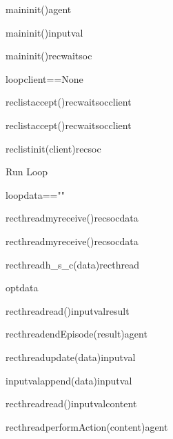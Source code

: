 \documentclass{article}
\begin{document}
\begin{figure}
\begin{sequencediagram}[.9]
		\begin{messcall}{main}{init()}{agent}{}		
		\end{messcall}		
		\begin{messcall}{main}{init()}{inputval}
		\end{messcall}
		\begin{messcall}{main}{init()}{recwaitsoc}{}		
		\end{messcall}		
		\begin{sdblock}{loop}{client==None}
			\begin{call}{reclist}{accept()}{recwaitsoc}{client}
			\end{call}
		\end{sdblock}
		\begin{call}{reclist}{accept()}{recwaitsoc}{client}
		\end{call}		
		\begin{messcall}{reclist}{init(client)}{recsoc}{}
		\end{messcall}			
		\begin{sdblock}[green!20]{Run Loop}{}
			\begin{sdblock}{loop}{data==""}
				\begin{call}{recthread}{myreceive()}{recsoc}{data}
				\end{call}		
			\end{sdblock}	
			\begin{call}{recthread}{myreceive()}{recsoc}{data}
			\end{call}					
			\begin{call}{recthread}{\small h\_s\_c(data)}{recthread}{}
				\begin{sdblock}{opt}{data}
					\begin{call}{recthread}{read()}{inputval}{result}
					\end{call}
					\begin{messcall}{recthread}{\small endEpisode(result)}{agent}
					\end{messcall}
				\end{sdblock}
			\end{call}
			\begin{messcall}{recthread}{update(data)}{inputval}{}
				\begin{call}{inputval}{\scriptsize append(data)}{inputval}{}
				\end{call}				
			\end{messcall}
			\begin{call}{recthread}{read()}{inputval}{content}
			\end{call}
			\begin{messcall}{recthread}{performAction(content)}{agent}{}
			\end{messcall}
		\end{sdblock}
		
		
	\end{sequencediagram}
	
\end{figure}	
\end{document}
